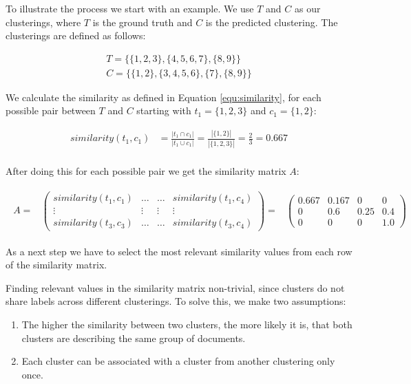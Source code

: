 To illustrate the process we start with an example. We use $T$ and $C$ as our clusterings, where $T$ is the ground truth and $C$ is the predicted clustering. The clusterings are defined as follows:

\begin{gather*}
    T = \{\{1,2,3\},\{4,5,6,7\},\{8,9\}\} \\
    C = \{\{1,2\},\{3,4,5,6\},\{7\},\{8,9\}\}
\end{gather*}

We calculate the similarity as defined in Equation \eqref{equ:similarity}, for each possible pair between $T$ and $C$ starting with $t_1= \{1,2,3\}$ and $c_1 = \{1,2\}$:

\begin{align*}
    similarity(t_1,c_1) &=\frac{|t_1 \cap c_1|}{|t_1 \cup c_1|}
    = \frac{|\{1,2\}|}{|\{1,2,3\}|}
    = \frac{2}{3} = 0.667 \\
\end{align*}

After doing this for each possible pair we get the similarity matrix $A$:

\begin{gather*}
\begin{array}{rcl}
    A = & \left(\begin{array}{cccc}
        similarity(t_1,c_1) & \hdots & \hdots & similarity(t_1,c_4)\\
        \vdots & \vdots & \vdots & \vdots\\
        similarity(t_3,c_3) & \hdots & \hdots & similarity(t_3,c_4) \end{array}\right)
        = & \left(\begin{array}{cccc}
            0.667 & 0.167 & 0 & 0 \\
            0 & 0.6 & 0.25 & 0.4 \\
            0 &  0 & 0 & 1.0 \end{array}\right)
\end{array}
\end{gather*}

As a next step we have to select the most relevant similarity values from each row of the similarity matrix.

Finding relevant values in the similarity matrix non-trivial, since clusters do not share labels across different clusterings. To solve this, we make two assumptions:
\begin{enumerate}
\item The higher the similarity between two clusters, the more likely it is, that both clusters are describing the same group of documents.
\item Each cluster can be associated with a cluster from another clustering only once.
\end{enumerate}

